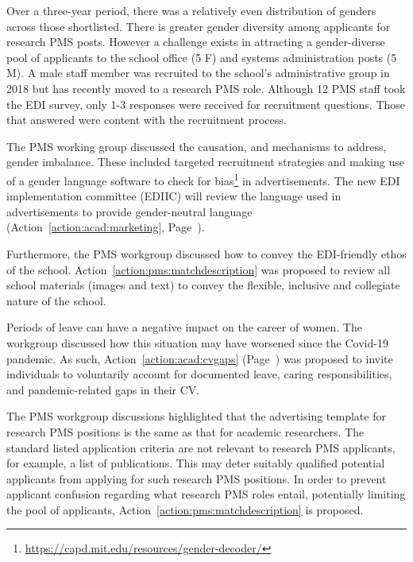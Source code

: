 


Over a three-year period, there was a relatively even distribution of genders across those shortlisted.  
There is greater gender diversity among applicants for research PMS posts. However a challenge exists in attracting a gender-diverse pool of applicants to the school office (5 F) and systems administration posts (5 M). A male staff member was recruited to the school’s administrative group in 2018 but has recently moved to a research PMS role. 
Although 12 PMS staff took the EDI survey, only 1-3 responses were received for recruitment questions. Those that answered were content with the recruitment process.

The PMS working group discussed the causation, and mechanisms to address, gender imbalance. 
These included targeted recruitment strategies and making use of a gender language software to check for bias\footnote{\url{https://capd.mit.edu/resources/gender-decoder/}} in advertisements. The new \ac{EDI} implementation committee (EDIIC) will review the language used in advertisements to provide gender-neutral language (Action~\ref{action:acad:marketing},  Page~\pageref{action:acad:marketing}).

Furthermore, the PMS workgroup discussed how to convey the EDI-friendly ethos of the school. Action~\ref{action:pms:matchdescription} was proposed to review all school materials (images and text) to convey the flexible, inclusive and collegiate nature of the school. 

Periods of leave can have a negative impact on the career of women. The workgroup discussed how this situation may have worsened since the Covid-19 pandemic. As such, Action~\ref{action:acad:cvgaps} (Page~\pageref{action:acad:cvgaps}) was proposed to invite individuals to voluntarily account for documented leave, caring responsibilities, and pandemic-related gaps in their CV. 




The PMS workgroup discussions highlighted that the advertising template for research PMS positions is the same as that for academic researchers. The standard listed application criteria are not relevant to research PMS applicants, for example, a list of publications. This may deter suitably qualified potential applicants from applying for such research PMS positions. 
In order to prevent applicant confusion regarding what research PMS roles entail, potentially limiting the pool of applicants, Action~\ref{action:pms:matchdescription} is proposed. 



